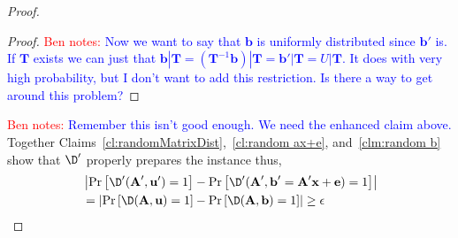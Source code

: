 \documentclass[11pt]{article}
\newcommand{\vect}[1]{\ensuremath{\textbf{#1}}}
\newcommand{\authnote}[2]{{\textcolor{red}{\textsf{#1 notes: }\textcolor{blue}{ #2}}\marginpar{\textcolor{red}{\textbf{!!!!!}}}}}
\newcommand{\authnote}[2]{}
\newcommand{\bnote}[1]{{\authnote{Ben}{#1}}}
\newcommand{\ve}{\vect{e}}
\newcommand{\vA}{\vect{A}}
\newcommand{\vT}{\vect{T}}
\newcommand{\vx}{\vect{x}}
\newcommand{\vb}{\vect{b}}
\newcommand{\vu}{\vect{u}}
\newcommand{\ignore}[1]{}
\begin{document}
{\begin{proof}
\begin{proof}
 \bnote{Now we want to say that $\vb$ is uniformly distributed since $\vb'$ is.  If $\vT$ exists we can just that $\vb | \vT = (\vT^{-1} \vb )| \vT = \vb' | \vT = U | \vT$.  It does with very high probability, but I don't want to add this restriction.  Is there a way to get around this problem?}
\end{proof}
\bnote{Remember this isn't good enough.  We need the enhanced claim above.}
Together Claims~\ref{cl:randomMatrixDist},~\ref{cl:random ax+e}, and~\ref{clm:random b} show that $\D'$ properly prepares the instance thus, 
\begin{align*}
&\left|\Pr\left[\D'(\vA', \vu') = 1\right]- \Pr\left[\D'(\vA', \vb'=\vA'\vx + \ve)=1\right]  \right|\\
& =\left|\Pr\left[\D(\vA, \vu)=1\right]- \Pr\left[\D(\vA, \vb)=1\right]  \right|\geq \epsilon
\end{align*}
\ignore{
Before randomized:
$$\vA'\vx' + \ve = \vb'$$
For $i = 1\ldots m$,
$$\sum^{n+\alpha}_{j=1}A_{ij}x_j + e_i = b_i$$
For $i = 1\ldots \alpha$,
$$\sum^{n+\alpha}_{j=1}A_{(m+i)j}x_j = \sum^{n}_{j=1}F_{ij}x_j + x_{n+i} = b_{m+i}$$
}
\end{proof}
}
\end{document}
